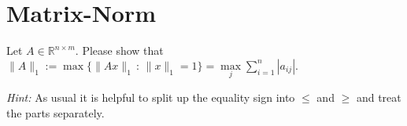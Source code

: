 \section{Matrix-Norm}
Let $A\in\mathbb{R}^{n\times m}$.
Please show that
$\| A \|_1 := \max \lbrace \| Ax \|_1 \,\colon\, \|x\|_1 = 1 \rbrace = \max\limits_{j} \sum_{i=1}^{n} |a_{ij}|.$

\textit{Hint: }As usual it is helpful to split up the equality sign into $\leq$ and $\geq$ and treat the parts separately. 